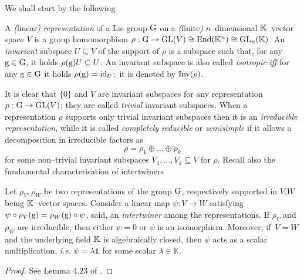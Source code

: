 We shall start by the following
\begin{defi}\label{irr_reprs_def}
{A \emph{(}linear\emph{)} \emph{representation} of a Lie group $\text{\normalfont G}$ on a \emph{(}finite\emph{)} $n$--dimensional $\mathbb{K}$--vector space $V$ is a group homomorphism $\rho:\text{\normalfont G}\to\text{\normalfont GL}(V)\cong\text{\normalfont End}(\mathbb{K}^n)\cong\text{\normalfont GL}_n(\mathbb{K})$. An \emph{invariant} subspace $U\subseteq V$ of the support of $\rho$ is a subspace such that, for any $\text{\normalfont g}\in\text{\normalfont G}$, it holds $\rho(\text{\normalfont g})U\subseteq U$. An invariant subspace is also called \emph{isotropic} \emph{iff} for any $\text{\normalfont g}\in\text{\normalfont G}$ it holds $\rho(\text{\normalfont g})=\text{\normalfont id}_U$;\, it is denoted by $\text{\normalfont Inv}(\rho)$}.
\end{defi}
{It is clear that $\{0\}$ and $V$ are invariant subspaces for any representation $\rho:\text{\normalfont G}\to\text{\normalfont GL}(V)$; they are called \emph{trivial} invariant subspaces. When a representation $\rho$ supports only trivial invariant subspaces then it is an \emph{irreducible representation}, while it is called \emph{completely reducible} or \emph{semisimple} if it allows a decomposition in irreducible factors as
$$\rho=\rho_1\oplus\hdots\oplus\rho_k$$
for some non--trivial invariant subspaces $V_1,\hdots,V_k\subseteq V$ for $\rho$.
}
\newpage
Recall also the fundamental characterisation of intertwiners

\begin{teo}\label{shur}
    Let $\rho_V,\rho_W$ be two representations of the group $\text{\normalfont G}$, respectively supported in $V$,$W$ being $\mathbb{K}$--vector spaces. Consider a linear map $\psi:V\to W$ satisfying \,$\psi\circ\rho_V(\text{\normalfont g})=\rho_W(\text{\normalfont g})\circ\psi$, said, an \emph{intertwiner} among the representations. If $\rho_V$ and $\rho_W$ are irreducible, then either $\psi=0$ or $\psi$ is an isomorphism. Moreover, if \,$V=W$ and the underlying field $\mathbb{K}$ is algebraically closed, then $\psi$ acts as a scalar multiplication, \emph{i.e.} $\psi=\lambda\mathbb{1}$ for some scalar $\lambda\in\mathbb{K}$.
\end{teo}
\begin{proof}
    See Lemma 4.23 of \cite{kirillov}.
\end{proof}

